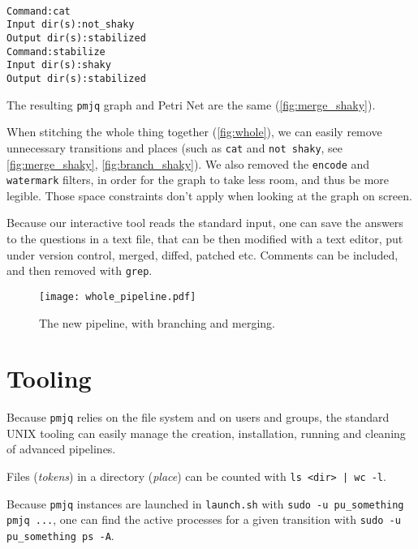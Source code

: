 \documentclass[letterpaper,twocolumn,10pt]{article}
\begin{document}
{\tt \small
\begin{verbatim}
Command:cat
Input dir(s):not_shaky
Output dir(s):stabilized
Command:stabilize
Input dir(s):shaky
Output dir(s):stabilized
\end{verbatim}
}

The resulting {\tt pmjq} graph and Petri Net are the same (\autoref{fig:merge_shaky}).

When stitching the whole thing together (\autoref{fig:whole}), we can easily remove unnecessary transitions and places (such as {\tt cat} and {\tt not shaky}, see \autoref{fig:merge_shaky}, \ref{fig:branch_shaky}). We also removed the {\tt encode} and {\tt watermark} filters, in order for the graph to take less room, and thus be more legible. Those space constraints don't apply when looking at the graph on screen.

Because our interactive tool reads the standard input, one can save the answers to the questions in a text file, that can be then modified with a text editor, put under version control, merged, diffed, patched etc. Comments can be included, and then removed with {\tt grep}.

\begin{figure}[t]
\begin{center}
\texttt{[image: whole\_pipeline.pdf]}
\end{center}
\caption{The new pipeline, with branching and merging.}
\label{fig:whole}
\end{figure}



\section{Tooling}
\label{sec:tooling}
Because {\tt pmjq} relies on the file system and on users and groups, the standard UNIX tooling can easily manage the creation, installation, running and cleaning of advanced pipelines.

Files (\emph{tokens}) in a directory (\emph{place}) can be counted with {\tt ls <dir> | wc -l}.

Because {\tt pmjq} instances are launched in {\tt launch.sh} with {\tt sudo -u pu\_something pmjq ...}, one can find the active processes for a given transition with {\tt sudo -u pu\_something ps -A}.
\end{document}
